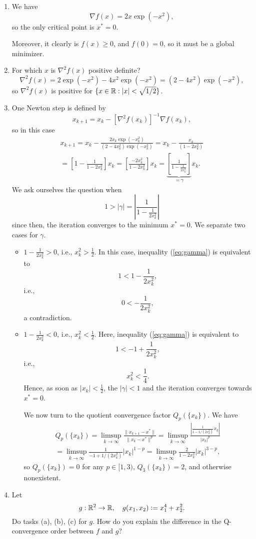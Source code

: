 \begin{enumerate}

\item We have
\[
\nabla f(x) = 2x\exp(-x^2),
\]
so the only critical point is $x^*=0$.

Moreover, it clearly is $f(x)\ge 0$, and $f(0) = 0$, so it must be a global
minimizer.

\item For which $x$ is $\nabla^2 f(x)$ positive definite?
\[
\nabla^2 f(x) = 2\exp(-x^2) - 4x^2\exp(-x^2) = (2-4x^2)\exp(-x^2),
\]
so $\nabla^2 f(x)$ is positive for $\{x\in\mathbb{R}: |x|<\sqrt{1/2}\}$.

\item One Newton step is defined by
\[
x_{k+1} = x_k - [\nabla^2 f(x_k)]^{-1} \nabla f(x_k),
\]
so in this case
\begin{multline*}
x_{k+1}
= x_k - \frac{2x_k\exp(-x_k^2)}{(2-4x_k^2)\exp(-x_k^2)}
= x_k - \frac{x_k}{(1-2x_k^2)}\\
= \left[1 - \frac{1}{1-2x_k^2}\right] x_k
= \left[\frac{-2x_k^2}{1-2x_k^2}\right] x_k
= \underbrace{\left[\frac{1}{1-\frac{1}{2x_k^2}}\right]}_{=\gamma} x_k.
\end{multline*}
We ask ourselves the question when
\begin{equation}\label{eq:gamma}
1 > |\gamma| = \left|\frac{1}{1-\frac{1}{2x_k^2}}\right|
\end{equation}
since then, the iteration converges to the minimum $x^*=0$.
We separate two cases for $\gamma$.
\begin{itemize}
\item $1-\frac{1}{2x_k^2} > 0$, i.e., $x_k^2 > \frac{1}{2}$.
      In this case, inequality (\ref{eq:gamma}) is equivalent to
\[
1 < 1 - \frac{1}{2x_k^2},
\]
i.e.,
\[
0 < - \frac{1}{2x_k^2},
\]
a contradiction.

\item $1-\frac{1}{2x_k^2} < 0$, i.e., $x_k^2 < \frac{1}{2}$.
      Here, inequality (\ref{eq:gamma}) is equivalent to
\[
1 < -1 + \frac{1}{2x_k^2},
\]
i.e.,
\[
x_k^2 < \frac{1}{4}.
\]
Hence, as soon as $|x_k| < \frac{1}{2}$, the $|\gamma| < 1$ and the iteration
converges towards $x^*=0$.

We now turn to the quotient convergence factor $Q_p(\{x_k\})$. We have
\begin{multline*}
Q_p(\{x_k\})
= \limsup_{k\to\infty} \frac{\|x_{k+1}-x^*\|}{\|x_k-x^*\|^p}
= \limsup_{k\to\infty} \frac{\left|\frac{1}{1-1/(2x_k^2)} x_k\right|}{|x_k|^p}\\
= \limsup_{k\to\infty} \frac{1}{-1+1/(2x_k^2)} |x_k|^{1-p}
= \limsup_{k\to\infty} \frac{2}{1-2x_k^2} |x_k|^{3-p},
\end{multline*}
so $Q_p(\{x_k\})=0$ for any $p\in[1,3)$, $Q_3(\{x_k\}) = 2$, and otherwise nonexistent.
\end{itemize}



  \item Let
    \[
       g: \mathbb{R}^2 \to \mathbb{R},\quad g(x_1, x_2) \mathrel{\mathop:}= x_1^4 + x_2^2.
    \]
    Do tasks (a), (b), (c) for $g$.
 How do you explain the difference in the Q-convergence order between $f$ and $g$?
\end{enumerate}
